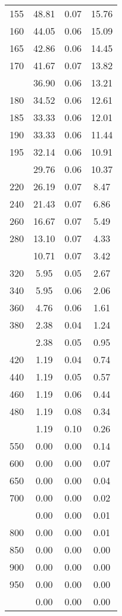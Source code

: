 \begin{table}[ht]
\begin{tabular}{lccc}
  155 & 48.81 & 0.07 & 15.76 \\ 
  160 & 44.05 & 0.06 & 15.09 \\ 
  165 & 42.86 & 0.06 & 14.45 \\ 
  170 & 41.67 & 0.07 & 13.82 \\ 
   \addlinespace
175 & 36.90 & 0.06 & 13.21 \\ 
  180 & 34.52 & 0.06 & 12.61 \\ 
  185 & 33.33 & 0.06 & 12.01 \\ 
  190 & 33.33 & 0.06 & 11.44 \\ 
  195 & 32.14 & 0.06 & 10.91 \\ 
   \addlinespace
200 & 29.76 & 0.06 & 10.37 \\ 
  220 & 26.19 & 0.07 & 8.47 \\ 
  240 & 21.43 & 0.07 & 6.86 \\ 
  260 & 16.67 & 0.07 & 5.49 \\ 
  280 & 13.10 & 0.07 & 4.33 \\ 
   \addlinespace
300 & 10.71 & 0.07 & 3.42 \\ 
  320 & 5.95 & 0.05 & 2.67 \\ 
  340 & 5.95 & 0.06 & 2.06 \\ 
  360 & 4.76 & 0.06 & 1.61 \\ 
  380 & 2.38 & 0.04 & 1.24 \\ 
   \addlinespace
400 & 2.38 & 0.05 & 0.95 \\ 
  420 & 1.19 & 0.04 & 0.74 \\ 
  440 & 1.19 & 0.05 & 0.57 \\ 
  460 & 1.19 & 0.06 & 0.44 \\ 
  480 & 1.19 & 0.08 & 0.34 \\ 
   \addlinespace
500 & 1.19 & 0.10 & 0.26 \\ 
  550 & 0.00 & 0.00 & 0.14 \\ 
  600 & 0.00 & 0.00 & 0.07 \\ 
  650 & 0.00 & 0.00 & 0.04 \\ 
  700 & 0.00 & 0.00 & 0.02 \\ 
   \addlinespace
750 & 0.00 & 0.00 & 0.01 \\ 
  800 & 0.00 & 0.00 & 0.01 \\ 
  850 & 0.00 & 0.00 & 0.00 \\ 
  900 & 0.00 & 0.00 & 0.00 \\ 
  950 & 0.00 & 0.00 & 0.00 \\ 
   \addlinespace
1000 & 0.00 & 0.00 & 0.00 \\ 
   \bottomrule
\end{tabular}
\end{table}
